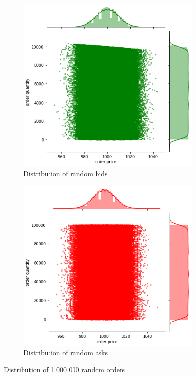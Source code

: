 \begin{figure}[H]
    \centering
    \begin{subfigure}{.5\textwidth}
      \centering
      \includegraphics[width=\linewidth]{plots/order_distr_bid.png}
      \caption{Distribution of random bids}
      \label{fig:gener_bids}
    \end{subfigure}%
    \begin{subfigure}{.5\textwidth}
      \centering
      \includegraphics[width=\linewidth]{plots/order_distr_ask.png}
      \caption{Distribution of random asks}
      \label{fig:gener_asks}
    \end{subfigure}
    \caption{Distribution of 1 000 000 random orders}
    \label{fig:generated_orders}
\end{figure}



